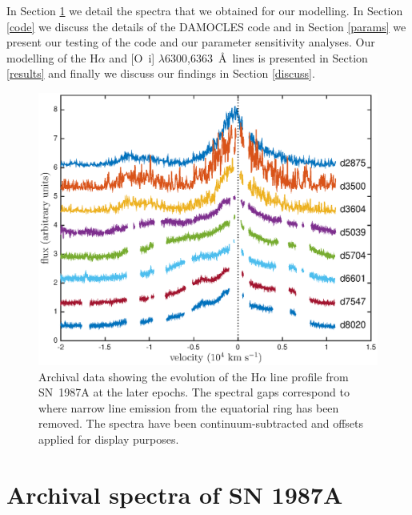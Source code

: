 \documentclass[useAMS,usenatbib,usegraphicx]{mnras}
\begin{document}
In Section \ref{spectra} we detail the spectra that we obtained for our 
modelling.  In Section \ref{code} we discuss the details of the DAMOCLES 
code and in Section \ref{params} we present our testing of the code and our parameter sensitivity 
analyses.  Our modelling of the H$\alpha$ and 
[O~{\sc i}] $\lambda$6300,6363~\AA\ lines is presented in Section 
\ref{results} and finally we discuss our findings in Section \ref{discuss}.



\begin{figure}
\includegraphics[trim =45 10 45 15,clip=true,scale=0.51]{Ha_evol_late_1col}
\caption{Archival data showing the evolution of the H$\alpha$
line profile from SN~1987A at the later epochs. The spectral gaps 
correspond to where narrow line emission from the equatorial ring has been 
removed. The spectra have been continuum-subtracted and offsets applied 
for display purposes.}
\label{Ha_evol_late}
\end{figure}


\section{Archival spectra of SN 1987A}
\label{spectra}
\end{document}
